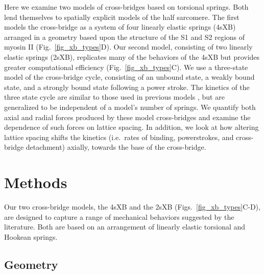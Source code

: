 \documentclass[]{article}
\begin{document}
Here we examine two models of cross-bridges based on torsional springs.  
Both lend themselves to spatially explicit models of the half sarcomere. 
The first models the cross-bridge as a system of  four linearly elastic springs (4sXB) arranged in a geometry based upon the structure of the S1 and S2 regions of myosin II (Fig.~\ref{fig_xb_types}D). 
Our second model, consisting of two linearly elastic springs (2sXB), replicates many of the behaviors of the 4sXB but provides greater computational efficiency (Fig.~\ref{fig_xb_types}C). 
We use a three-state model of the cross-bridge cycle, consisting of an unbound state, a weakly bound state, and a strongly bound state following a power stroke. 
The kinetics of the three state cycle are similar to those used in previous models \citep{Pate1989, Daniel1998, Tanner2007}, but are generalized to be independent of a model's number of springs.
We quantify both axial and radial forces produced by these model cross-bridges and examine the dependence of such forces on lattice spacing.
In addition, we look at how altering lattice spacing shifts the kinetics (i.e.\ rates of binding, powerstrokes, and cross-bridge detachment) axially, towards the base of the cross-bridge. 




\section{Methods}  %

Our two cross-bridge models, the 4sXB and the 2sXB (Figs.~\ref{fig_xb_types}C-D), are designed to capture a range of mechanical behaviors suggested by the literature.  
Both are based on an arrangement of linearly elastic torsional and Hookean springs.  

\subsection*{Geometry} %

\end{document}

